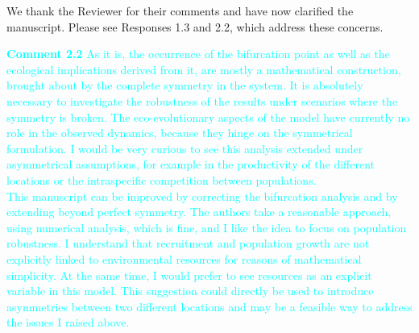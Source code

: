 \documentclass[ucm,12pt]{ucletter}
\begin{document}
\begin{letter}
 We thank the Reviewer for their comments and have now clarified the manuscript. Please see Responses 1.3 and 2.2, which address these concerns.

\noindent \textcolor{cyan}{
{\bf Comment 2.2} As it is, the occurrence of the bifurcation point as well as the ecological implications derived from it, are mostly a mathematical construction, brought about by the complete symmetry in the system. It is absolutely necessary to investigate the robustness of the results under scenarios where the symmetry is broken. The eco-evolutionary aspects of the model have currently no role in the observed dynamics, because they hinge on the symmetrical formulation.
I would be very curious to see this analysis extended under asymmetrical assumptions, for example in the productivity of the different locations or the intraspecific competition between populations.
\\
This manuscript can be improved by correcting the bifurcation analysis and by extending beyond perfect symmetry. The authors take a reasonable approach, using numerical analysis, which is fine, and I like the idea to focus on population robustness.  I understand that recruitment and population growth are not explicitly linked to environmental resources for reasons of mathematical simplicity. At the same time, I would prefer to see resources as an explicit variable in this model. This suggestion could directly be used to introduce asymmetries between two different locations and may be a feasible way to address the issues I raised above.
}


\end{letter}
\end{document}
